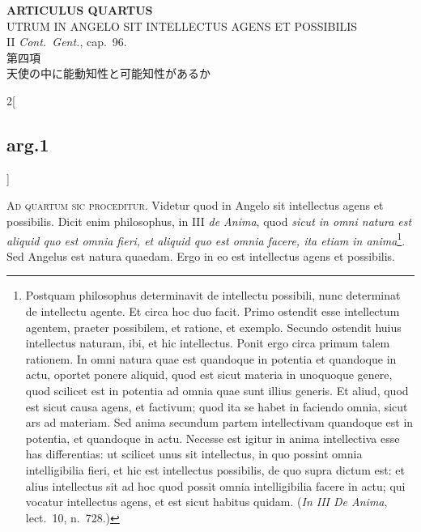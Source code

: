\documentclass[paper=a4paper,fontsize=10pt,jafontsize=9pt,titlepage]{jlreq}
\begin{document}
\newpage
{}
{}
\setcounter{section}{4}
\setcounter{subsection}{0}





\begin{center}
 {\Large {\bfseries ARTICULUS QUARTUS}}\\
 {\large UTRUM IN ANGELO SIT INTELLECTUS AGENS ET POSSIBILIS}\\
 {\footnotesize II {\itshape Cont.~Gent.}, cap.~96.}\\
 {\Large 第四項\\天使の中に能動知性と可能知性があるか}
\end{center}

\begin{paracol}{2}[\subsection{arg.1}]

{\huge A}{\scshape d quartum sic proceditur}. Videtur quod in Angelo sit
intellectus agens et possibilis. Dicit enim philosophus, in III
{\itshape de Anima}, quod {\itshape sicut in omni natura est aliquid quo
est omnia fieri, et aliquid quo est omnia facere, ita etiam in
anima}\footnote{Postquam philosophus determinavit de intellectu
 possibili, nunc determinat de intellectu agente. Et circa hoc duo
 facit. Primo ostendit esse intellectum agentem, praeter possibilem, et
 ratione, et exemplo. Secundo ostendit huius intellectus naturam, ibi,
 et hic intellectus. Ponit ergo circa primum talem rationem. In omni
 natura quae est quandoque in potentia et quandoque in actu, oportet
 ponere aliquid, quod est sicut materia in unoquoque genere, quod
 scilicet est in potentia ad omnia quae sunt illius generis. Et aliud,
 quod est sicut causa agens, et factivum; quod ita se habet in faciendo
 omnia, sicut ars ad materiam. Sed anima secundum partem intellectivam
 quandoque est in potentia, et quandoque in actu. Necesse est igitur in
 anima intellectiva esse has differentias: ut scilicet unus sit
 intellectus, in quo possint omnia intelligibilia fieri, et hic est
 intellectus possibilis, de quo supra dictum est: et alius intellectus
 sit ad hoc quod possit omnia intelligibilia facere in actu; qui vocatur
 intellectus agens, et est sicut habitus quidam. ({\itshape In III De
 Anima}, lect.~10, n.~728.)}. Sed Angelus est natura quaedam. Ergo in eo est intellectus agens
et possibilis.


\end{paracol}
\end{document}
